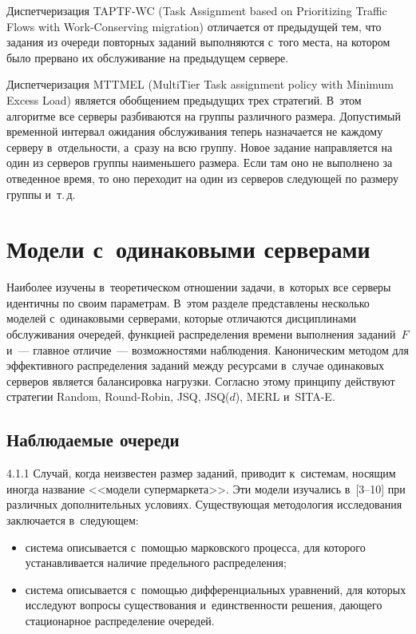 \begin{multicols}{2}
    Диспетчеризация TAPTF-WC (Task Assignment based on Prioritizing Traffic Flows with 
Work-Conserving migration) отличается от предыдущей тем, что задания из очереди 
повторных заданий выполняются с~того места, на котором было прервано их 
обслуживание на предыдущем сервере.
    
    Диспетчеризация MTTMEL (MultiTier Task assignment policy with Minimum Excess 
Load) является обобщением предыдущих трех стратегий. В~этом алгоритме все серверы 
разбиваются на группы различного размера. Допустимый временной интервал ожидания 
обслуживания теперь назначается не каж\-до\-му серверу в~отдельности, а~сразу на всю 
группу. Новое задание направляется на один из серверов группы наименьшего размера. 
Если там оно не выполнено за отведенное время, то оно переходит на один из серверов 
следующей по размеру группы и~т.\,д.

\section{Модели с~одинаковыми серверами}

    Наиболее изучены в~теоретическом отношении задачи, в~которых все серверы 
идентичны по своим параметрам. В~этом разделе представлены несколько моделей 
с~одинаковыми серверами, которые отличаются дисциплинами обслуживания очередей, 
функцией распределения времени выполнения заданий~$F$ и~--- главное отличие~--- 
возможностями наблюдения. Каноническим методом для эффективного распределения 
заданий между ресурсами в~случае одинаковых серверов является балансировка нагрузки. 
Согласно этому принципу действуют стратегии Random, Round-Robin, JSQ, JSQ($d$), 
MERL и~SITA-E.

\subsection{Наблюдаемые очереди}
    
    4.1.1 Случай, когда неизвестен размер заданий, приводит к~системам, носящим иногда 
название <<модели супермаркета>>. Эти модели изучались в~[3--10] при различных 
дополнительных условиях. Существующая методология исследования заключается 
в~следующем:
    \begin{itemize}
    \item  система описывается с~помощью марковского процесса, для которого 
устанавливается наличие предельного распределения;
    \item система описывается с~помощью дифференциальных уравнений, для которых 
исследуют вопросы существования и~единственности решения, дающего стационарное 
распределение очередей.
    \end{itemize}
    

\end{multicols}
